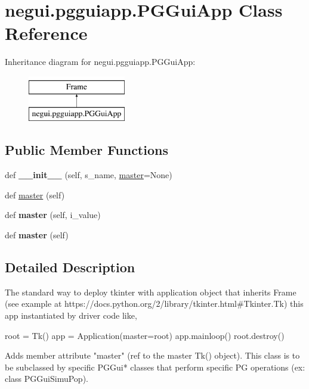 \hypertarget{classnegui_1_1pgguiapp_1_1PGGuiApp}{}\section{negui.\+pgguiapp.\+P\+G\+Gui\+App Class Reference}
\label{classnegui_1_1pgguiapp_1_1PGGuiApp}
Inheritance diagram for negui.\+pgguiapp.\+P\+G\+Gui\+App\+:\begin{figure}[H]
\begin{center}
\leavevmode
\includegraphics[height=2.000000cm]{classnegui_1_1pgguiapp_1_1PGGuiApp}
\end{center}
\end{figure}
\subsection*{Public Member Functions}
\begin{DoxyCompactItemize}
\item 
def {\bfseries \+\_\+\+\_\+init\+\_\+\+\_\+} (self, s\+\_\+name, \hyperlink{classnegui_1_1pgguiapp_1_1PGGuiApp_a0af5ea1a1b6d1565002150d7b53efbdc}{master}=None)\hypertarget{classnegui_1_1pgguiapp_1_1PGGuiApp_a0490187d0d326fa3582bb5832fc3e79c}{}\label{classnegui_1_1pgguiapp_1_1PGGuiApp_a0490187d0d326fa3582bb5832fc3e79c}

\item 
def \hyperlink{classnegui_1_1pgguiapp_1_1PGGuiApp_a0af5ea1a1b6d1565002150d7b53efbdc}{master} (self)
\item 
def {\bfseries master} (self, i\+\_\+value)\hypertarget{classnegui_1_1pgguiapp_1_1PGGuiApp_ae579e97c5e2389a1745f8299fe846d5a}{}\label{classnegui_1_1pgguiapp_1_1PGGuiApp_ae579e97c5e2389a1745f8299fe846d5a}

\item 
def {\bfseries master} (self)\hypertarget{classnegui_1_1pgguiapp_1_1PGGuiApp_a0af5ea1a1b6d1565002150d7b53efbdc}{}\label{classnegui_1_1pgguiapp_1_1PGGuiApp_a0af5ea1a1b6d1565002150d7b53efbdc}

\end{DoxyCompactItemize}


\subsection{Detailed Description}
\begin{DoxyVerb}The standard way to deploy tkinter with application object that inherits Frame
(see example at https://docs.python.org/2/library/tkinter.html#Tkinter.Tk)
this app instantiated by driver code like, 

root = Tk()
app = Application(master=root)
app.mainloop()
root.destroy()

Adds member attribute "master" (ref to the master Tk() object).
This class is to be subclassed by specific PGGui* classes that
perform specific PG operations (ex: class PGGuiSimuPop).
\end{DoxyVerb}
 

